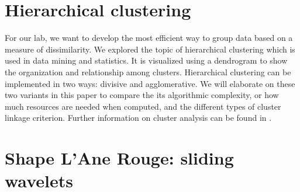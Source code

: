\documentclass{article}
\begin{document}
  
  
  
  

\part{Hierarchical clustering}

  For our lab, we want to develop the most efficient way to group data
  based on a measure of dissimilarity. We explored the topic of
  hierarchical clustering which is used in data mining and statistics.
  It is visualized using a dendrogram to show the organization and relationship
  among clusters. Hierarchical clustering can be implemented in two
  ways: divisive and agglomerative. We will elaborate on these two variants
  in this paper to compare the its algorithmic complexity, or how much
  resources are needed when computed, and the different types of cluster
  linkage criterion. Further information on cluster analysis can be
  found in \cite{ClusterAnalysis}.

  
  
  

\part{Shape L'Ane Rouge: sliding wavelets}
  
  

\newpage


\end{document}
